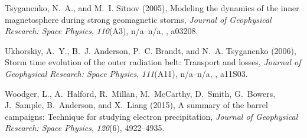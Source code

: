 \documentclass[draft, linenumbers]{agujournal}
\begin{document}
\begin{thebibliography}{49}
Tsyganenko, N.~A., and M.~I. Sitnov (2005), Modeling the dynamics of the inner
  magnetosphere during strong geomagnetic storms, \textit{Journal of
  Geophysical Research: Space Physics}, \textit{110}(A3), n/a--n/a,
  , a03208.

Ukhorskiy, A.~Y., B.~J. Anderson, P.~C. Brandt, and N.~A. Tsyganenko (2006),
  Storm time evolution of the outer radiation belt: Transport and losses,
  \textit{Journal of Geophysical Research: Space Physics}, \textit{111}(A11),
  n/a--n/a, , a11S03.

Woodger, L., A.~Halford, R.~Millan, M.~McCarthy, D.~Smith, G.~Bowers,
  J.~Sample, B.~Anderson, and X.~Liang (2015), A summary of the barrel
  campaigns: Technique for studying electron precipitation, \textit{Journal of
  Geophysical Research: Space Physics}, \textit{120}(6), 4922--4935.

\end{thebibliography}

%
%
%
%
%
%
%
%
%
%


\end{document}
